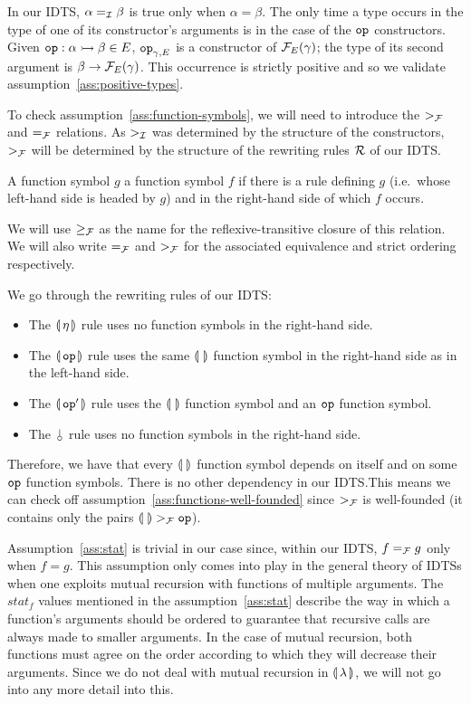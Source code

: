 In our IDTS, $\alpha =_{\mathcal{I}} \beta$ is true only when $\alpha = \beta$. The
only time a type occurs in the type of one of its constructor's arguments
is in the case of the $\mathtt{op}$ constructors. Given
$\mathtt{op} : \alpha \rightarrowtail \beta \in E$, $\mathtt{op}_{\gamma,E}$ is a constructor
of $\mathcal{F}_E(\gamma)$; the type of its second argument is
$\beta \to \mathcal{F}_E(\gamma)$. This occurrence is strictly positive and so we
validate assumption~\ref{ass:positive-types}.

To check assumption~\ref{ass:function-symbols}, we will need to introduce
the $>_{\mathcal{F}}$ and $=_{\mathcal{F}}$ relations. As $>_{\mathcal{I}}$ was determined by the
structure of the constructors, $>_{\mathcal{F}}$ will be determined by the structure
of the rewriting rules $\mathcal{R}$ of our IDTS.

\begin{definition}
  A function symbol $g$  a function symbol $f$ if there
  is a rule defining $g$ (i.e.\ whose left-hand side is headed by $g$) and
  in the right-hand side of which $f$ occurs.

  We will use $\ge_{\mathcal{F}}$ as the name for the reflexive-transitive closure of
  this relation. We will also write $=_{\mathcal{F}}$ and $>_{\mathcal{F}}$ for the associated
  equivalence and strict ordering respectively.
\end{definition}

We go through the rewriting rules of our IDTS:

\begin{itemize}
\item The $\llparenthesis \, \eta \, \rrparenthesis$ rule uses no function symbols in the right-hand
  side.
\item The $\llparenthesis \, \mathtt{op} \, \rrparenthesis$ rule uses the same $\llparenthesis \,  \, \rrparenthesis$ function symbol
  in the right-hand side as in the left-hand side.
\item The $\llparenthesis \, \mathtt{op}' \, \rrparenthesis$ rule uses the $\llparenthesis \,  \, \rrparenthesis$ function symbol and
  an $\mathtt{op}$ function symbol.
\item The $\cherry$ rule uses no function symbols in the right-hand side.
\end{itemize}

Therefore, we have that every $\llparenthesis \,  \, \rrparenthesis$ function symbol depends on itself
and on some $\mathtt{op}$ function symbols. There is no other dependency in our
IDTS.\@ This means we can check off
assumption~\ref{ass:functions-well-founded} since $>_{\mathcal{F}}$ is well-founded
(it contains only the pairs $\llparenthesis \,  \, \rrparenthesis >_{\mathcal{F}} \mathtt{op}$).

Assumption~\ref{ass:stat} is trivial in our case since, within our IDTS,
$f =_{\mathcal{F}} g$ only when $f = g$. This assumption only comes into play in the
general theory of IDTSs when one exploits mutual recursion with functions
of multiple arguments. The $stat_f$ values mentioned in the
assumption~\ref{ass:stat} describe the way in which a function's arguments
should be ordered to guarantee that recursive calls are always made to
smaller arguments. In the case of mutual recursion, both functions must
agree on the order according to which they will decrease their
arguments. Since we do not deal with mutual recursion in
$\llparenthesis \, \lambda \, \rrparenthesis$, we will not go into any more detail into
this.


